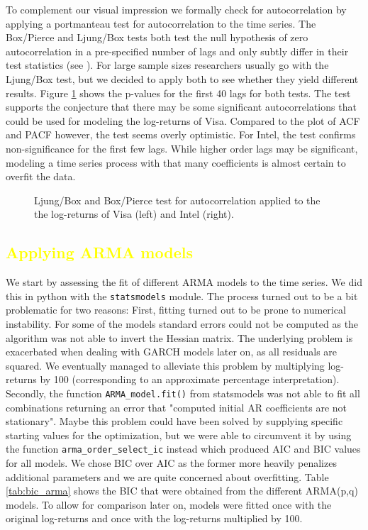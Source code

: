 To complement our visual impression we formally check for autocorrelation by applying a portmanteau test for autocorrelation to the time series. The Box/Pierce and Ljung/Box tests both test the null hypothesis of zero autocorrelation in a pre-specified number of lags and only subtly differ in their test statistics (see \cite{ljung_measure_1978}). For large sample sizes researchers usually go with the Ljung/Box test, but we decided to apply both to see whether they yield different results. Figure \ref{fig:ljungbox} shows the p-values for the first 40 lags for both tests. The test supports the conjecture that there may be some significant autocorrelations that could be used for modeling the log-returns of Visa. Compared to the plot of ACF and PACF however, the test seems overly optimistic. For Intel, the test confirms non-significance for the first few lags. While higher order lags may be significant, modeling a time series process with that many coefficients is almost certain to overfit the data. 

\begin{figure}[h!]
    \centering
    \begin{adjustbox}{width=.95\textwidth,center}
    
    
    \end{adjustbox}
    \caption{Ljung/Box and Box/Pierce test for autocorrelation applied to the the log-returns of Visa (left) and Intel (right).}
    \label{fig:ljungbox}
\end{figure}{}

\subsection{\textcolor{yellow}{Applying ARMA models}}
We start by assessing the fit of different ARMA models to the time series. We did this in python with the \texttt{statsmodels} module. \nocite{noauthor_statsmodels:_nodate} The process turned out to be a bit problematic for two reasons: First, fitting turned out to be prone to numerical instability. For some of the models standard errors could not be computed as the algorithm was not able to invert the Hessian matrix. The underlying problem is exacerbated when dealing with GARCH models later on, as all residuals are squared. We eventually managed to alleviate this problem by multiplying log-returns by 100 (corresponding to an approximate percentage interpretation). Secondly, the function \texttt{ARMA\_model.fit()} from statsmodels was not able to fit all combinations returning an error that "computed initial AR coefficients are not stationary". Maybe this problem could have been solved by supplying specific starting values for the optimization, but we were able to circumvent it by using the function \texttt{arma\_order\_select\_ic} instead which produced AIC and BIC values for all models. We chose BIC over AIC as the former more heavily penalizes additional parameters and we are quite concerned about overfitting. Table \ref{tab:bic_arma} shows the BIC that were obtained from the different ARMA(p,q) models. To allow for comparison later on, models were fitted once with the original log-returns and once with the log-returns multiplied by 100. 

